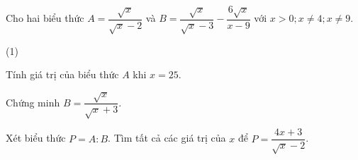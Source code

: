 
\begin{bt}
Cho hai biểu thức $A = \dfrac{\sqrt{x}}{\sqrt{x}-2}$ và $B = \dfrac{\sqrt{x}}{\sqrt{x}-3} - \dfrac{6\sqrt{x}}{x-9}$ với $x > 0; x \ne 4; x \ne 9$.
\begin{cacy}(1)
\item Tính giá trị của biểu thức $A$ khi $x = 25$.
\item Chứng minh $B = \dfrac{\sqrt{x}}{\sqrt{x}+3}$.
\item Xét biểu thức $P = A : B$. Tìm tất cả các giá trị của $x$ để $P = \dfrac{4x+3}{\sqrt{x}-2}$.
\end{cacy}
\loigiai{}
\end{bt}
